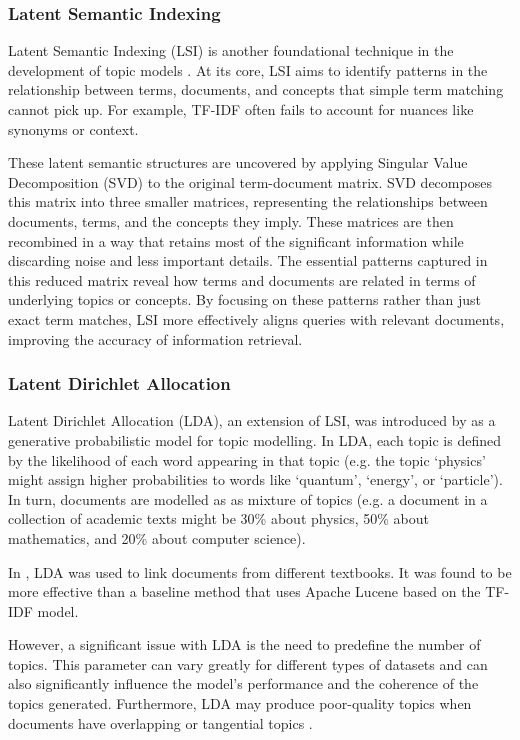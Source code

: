 \documentclass[twocolumn]{article}
\begin{document}
\subsubsection{Latent Semantic Indexing}

Latent Semantic Indexing (LSI) is another foundational technique in the development of topic models \cite{deerwester1990}. At its core, LSI aims to identify patterns in the relationship between terms, documents, and concepts that simple term matching cannot pick up. For example, TF-IDF often fails to account for nuances like synonyms or context.

These latent semantic structures are uncovered by applying Singular Value Decomposition (SVD) to the original term-document matrix. SVD decomposes this matrix into three smaller matrices, representing the relationships between documents, terms, and the concepts they imply. These matrices are then recombined in a way that retains most of the significant information while discarding noise and less important details. The essential patterns captured in this reduced matrix reveal how terms and documents are related in terms of underlying topics or concepts. By focusing on these patterns rather than just exact term matches, LSI more effectively aligns queries with relevant documents, improving the accuracy of information retrieval.

\subsubsection{Latent Dirichlet Allocation} \label{sec:lda}

Latent Dirichlet Allocation (LDA), an extension of LSI, was introduced by \textcite{blei2003} as a generative probabilistic model for topic modelling. In LDA, each topic is defined by the likelihood of each word appearing in that topic (e.g. the topic `physics' might assign higher probabilities to words like `quantum', `energy', or `particle'). In turn, documents are modelled as as mixture of topics (e.g. a document in a collection of academic texts might be 30\% about physics, 50\% about mathematics, and 20\% about computer science).

In \textcite{guerra2013}, LDA was used to link documents from different textbooks. It was found to be more effective than a baseline method that uses Apache Lucene based on the TF-IDF model.

However, a significant issue with LDA is the need to predefine the number of topics. This parameter can vary greatly for different types of datasets and can also significantly influence the model's performance and the coherence of the topics generated. Furthermore, LDA may produce poor-quality topics when documents have overlapping or tangential topics \cite{ajinaja2023}.
\end{document}
